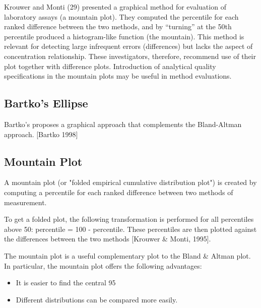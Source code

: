 \documentclass[12pt, a4paper]{report}
\begin{document}
Krouwer and Monti (29) presented a graphical method for evaluation of laboratory assays (a mountain plot). 
They computed the percentile for each ranked difference between the two methods, and by “turning” at the 50th percentile 
produced a histogram-like function (the mountain). 
This method is relevant for detecting large infrequent errors (differences) but lacks the aspect of concentration relationship. 
These investigators, therefore, recommend use of their plot together with difference plots. 
Introduction of analytical quality specifications in the mountain plots may be useful in method evaluations.

\newpage
\subsection*{Bartko’s Ellipse}

Bartko’s proposes a graphical approach that complements the Bland-Altman approach.
[Bartko 1998]

\subsection*{Mountain Plot}
A mountain plot (or "folded empirical cumulative distribution plot") is created by computing a percentile for each ranked difference between two methods of measurement.

To get a folded plot, the following transformation is performed for all percentiles above 50: percentile = 100 - percentile. These percentiles are then plotted against the differences between the two methods [Krouwer \& Monti, 1995].

The mountain plot is a useful complementary plot to the Bland \& Altman plot. 
In particular, the mountain plot offers the following advantages:
\begin{itemize}
	\item It is easier to find the central 95%
	\item Different distributions can be compared more easily.
	
\end{itemize}


\end{document}

